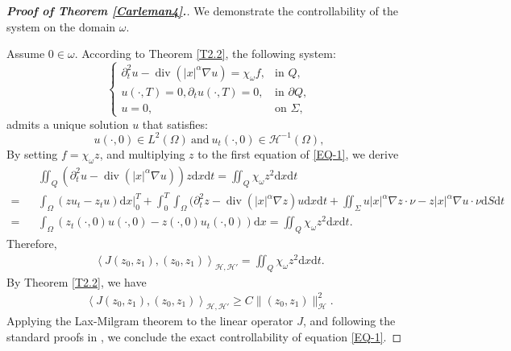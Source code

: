 \documentclass[11pt]{article}
\numberwithin{equation}{section}
\def\pt{\partial}
\def\bf{\textbf}
\def\pt{\partial}
\def\om{\omega}
\def\Om{\Omega}
\def\al{\alpha}
\def\df{\mathrm d}
\def\mcH{\mathcal{H}}
\DeclareMathOperator{\Div}{div}
\begin{document}
		\begin{proof}[\rm \bf{{\bf Proof of Theorem \ref{Carleman4}.}}]	We demonstrate the controllability of the system on the domain
			$\om$.
			
			Assume $0\in\om$. According to Theorem \ref{T2.2}, the following system:
			\begin{equation*}
				\begin{cases}
					\pt_t^2u-\Div(|x|^\al \nabla u)=\chi_\omega f, &\mbox{in } Q,\\
					u(\cdot,T)=0, \pt_tu(\cdot,T)=0, &\mbox{in }\pt Q,\\
					u=0, &\mbox{on }\Sigma,
				\end{cases}
			\end{equation*}
			admits a unique solution $u$ that satisfies:
			\begin{equation*}
				u(\cdot,0)\in L^2(\Omega) \ \mbox{and} \ u_t (\cdot,0)\in \mcH^{-1}(\Om),
			\end{equation*}			
			By setting $f=\chi_\om z$,  and multiplying $z$ to the first equation of \eqref{EQ-1}, we derive
			\begin{eqnarray*}
				&&\iint_Q\left(\pt_t^2u-\Div(|x|^\al \nabla u)\right)z\df x\df t=\iint_Q \chi_\om z^2\df x\df t\\
				=&& \int_{\Omega} \left( z u_t - z_t u \right) \df x \bigg|_0^T
				+\int_0^T \int_{\Omega} (\pt_t^2z -\Div(|x|^\al \nabla z) u \df x\df t + \iint_{\Sigma} u |x|^\al \nabla z \cdot \nu - z |x|^\al \nabla u \cdot \nu  \df S \df t\\
				=&& \int_{\Omega} \left( z_t(\cdot,0) u(\cdot,0) - z(\cdot,0) u_t(\cdot,0) \right) \df x =\iint_Q \chi_\om z^2\df x\df t.
			\end{eqnarray*}
			Therefore,
			\begin{equation*}
				\begin{split}
					\left\langle J(z_0,z_1), (z_0,z_1)\right\rangle _{\mcH,\mcH'}= \iint_Q \chi_\om z^2\df x\df t.
				\end{split}
			\end{equation*}
			By Theorem \ref{T2.2}, we have
			\begin{equation*}
				\begin{split}
					\left\langle J(z_0,z_1), (z_0,z_1)\right\rangle _{\mcH,\mcH'}\ge C \|(z_0,z_1)\|^2_{\mcH} .
				\end{split}
			\end{equation*}
			Applying the Lax-Milgram theorem to the linear operator $J$, and following the standard proofs in \cite{zuazua}, we conclude the exact controllability of equation \eqref{EQ-1}.
		\end{proof}
		
\end{document}

